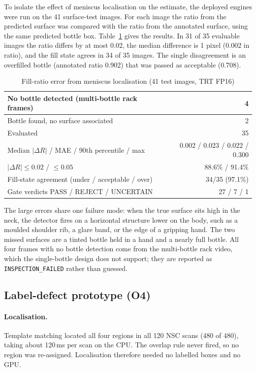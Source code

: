 To isolate the effect of meniscus localisation on the estimate, the deployed engines were run on the 41 surface-test images. For each image the ratio from the predicted surface was compared with the ratio from the annotated surface, using the same predicted bottle box. Table~\ref{tab:fillerr} gives the results. In 31 of 35 evaluable images the ratio differs by at most 0.02, the median difference is 1 pixel (0.002 in ratio), and the fill state agrees in 34 of 35 images. The single disagreement is an overfilled bottle (annotated ratio 0.902) that was passed as acceptable (0.708).

\begin{table}[htbp]
\centering
\caption{Fill-ratio error from meniscus localisation (41 test images, TRT FP16)}
\label{tab:fillerr}
\footnotesize
\begin{tabular}{|l|r|}
\hline
No bottle detected (multi-bottle rack frames) & 4 \\ \hline
Bottle found, no surface associated & 2 \\ \hline
Evaluated & 35 \\ \hline
Median $|\Delta R|$ / MAE / 90th percentile / max & 0.002 / 0.023 / 0.022 / 0.300 \\ \hline
$|\Delta R|\leq0.02$ / $\leq0.05$ & 88.6\% / 91.4\% \\ \hline
Fill-state agreement (under / acceptable / over) & 34/35 (97.1\%) \\ \hline
Gate verdicts PASS / REJECT / UNCERTAIN & 27 / 7 / 1 \\ \hline
\end{tabular}
\end{table}

The large errors share one failure mode: when the true surface sits high in the neck, the detector fires on a horizontal structure lower on the body, such as a moulded shoulder rib, a glare band, or the edge of a gripping hand. The two missed surfaces are a tinted bottle held in a hand and a nearly full bottle. All four frames with no bottle detection come from the multi-bottle rack video, which the single-bottle design does not support; they are reported as \texttt{INSPECTION\_FAILED} rather than guessed.

\subsection{Label-defect prototype (O4)}
\label{sec:res-label}

\paragraph{Localisation.} Template matching located all four regions in all 120 NSC scans (480 of 480), taking about 120\,ms per scan on the CPU. The overlap rule never fired, so no region was re-assigned. Localisation therefore needed no labelled boxes and no GPU.

